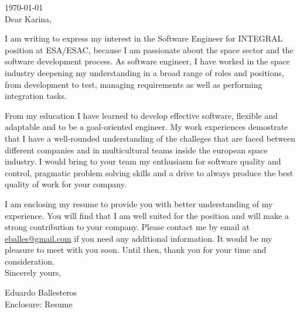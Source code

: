 \documentclass[11pt,a4paper,twoside]{moderncv}
\newcommand{\position}{Software Engineer for INTEGRAL} %
\newcommand{\company}{ESA/ESAC} %
\newcommand{\pollo}{Dear Karina,}
\newcommand{\companyAddress}{ }
\begin{document}
\maketitle

\noindent \today \\[1em]


\noindent \pollo

I am writing to express my interest in the {\position} position at {\company}, 
because I am passionate about the space sector and the software development
process. As software engineer, I have worked in the space industry deepening
my understanding in a broad range of roles and positions, from development 
to test, managing requirements as well as performing integration tasks. 

From my education I have learned to develop effective software, flexible and adaptable 
and to be a goal-oriented engineer. My work experiences demostrate that I have a 
well-rounded understanding of the challeges that are faced between different companies 
and in multicultural teams inside the european space industry. I would bring
to your team my enthusiasm for software quality and control, pragmatic problem
solving skills and a drive to always produce the best quality of work for your
company.

I am enclosing my resume to provide you with better understanding
of my experience. You will find that I am well suited for the position and
will make a strong contribution to your company. Please contact me by email at
\url{eballes@gmail.com} if you need any additional information. It would
be my pleasure to meet with you soon. Until then, thank you for your time and
consideration.\\[1.4ex]

\noindent Sincerely yours,

\noindent Eduardo Ballesteros\\[1.0ex]

\noindent Enclosure: Resume
\end{document}
